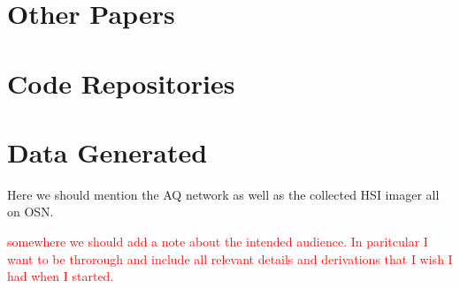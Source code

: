 \section{Other Papers}
\section{Code Repositories}
\section{Data Generated}
Here we should mention the AQ network as well as the collected HSI imager all on OSN.


\textcolor{red}{somewhere we should add a note about the intended audience. In paritcular I want to be throrough and include all relevant details and derivations that I wish I had when I started.}

